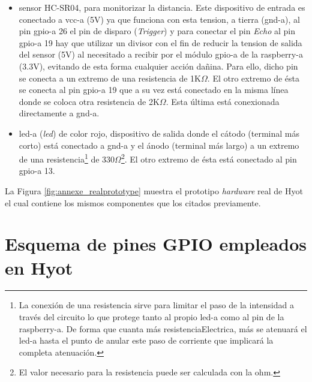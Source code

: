 \documentclass[12pt,a4paper, twoside]{report}
\begin{document}
\begin{itemize}
		\item \Gls{sensor} HC-SR04, para monitorizar la distancia. Este dispositivo de entrada es conectado a \gls{vcc-a} (5V) ya que funciona con esta \gls{tension}, a tierra (\gls{gnd-a}), al pin \gls{gpio-a} 26 el pin de disparo (\textit{Trigger}) y para conectar el pin \textit{Echo} al pin \gls{gpio-a} 19 hay que utilizar un \gls{divisor} con el fin de reducir la \gls{tension} de salida del \gls{sensor} (5V) al necesitado a recibir por el módulo \gls{gpio-a} de la \gls{raspberry-a} (3.3V), evitando de esta forma cualquier acción dañina. Para ello, dicho pin se conecta a un extremo de una \gls{resistencia} de 1K$\Omega$. El otro extremo de ésta se conecta al pin \gls{gpio-a} 19 que a su vez está conectado en la misma línea donde se coloca otra \gls{resistencia} de 2K$\Omega$. Esta última está conexionada directamente a \gls{gnd-a}.
		\item \gls{led-a} (\textit{\gls{led}}) de color rojo, dispositivo de salida donde el cátodo (terminal más corto) está conectado a \gls{gnd-a} y el ánodo (terminal más largo) a un extremo de una \gls{resistencia}\footnote{La conexión de una \gls{resistencia} sirve para limitar el paso de la \gls{intensidad} a través del circuito lo que protege tanto al propio \gls{led-a} como al pin de la \gls{raspberry-a}. De forma que cuanta más \gls{resistenciaElectrica}, más se atenuará el \gls{led-a} hasta el punto de anular este paso de corriente que implicará la completa atenuación.} de 330$\Omega$\footnote{El valor necesario para la \gls{resistencia} puede ser calculada con la \gls{ohm}.}. El otro extremo de ésta está conectado al pin \gls{gpio-a} 13.					
	\end{itemize}	
	
	La Figura \ref{fig:annexe_realprototype} muestra el \gls{prototipo} \textit{hardware} real de Hyot el cual contiene los mismos componentes que los citados previamente.
	
		
	\chapter{Esquema de pines GPIO empleados en Hyot}\label{prototypeGPIO}
	
\end{document}
